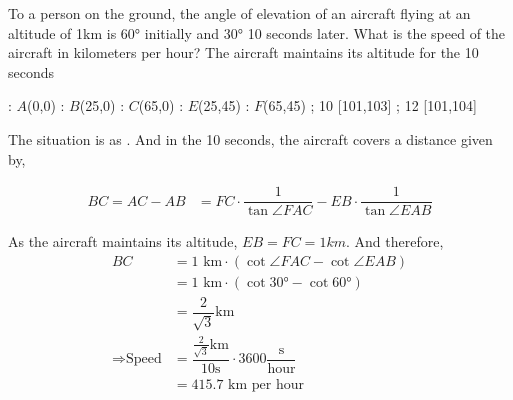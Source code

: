 

\question[3] To a person on the ground, the angle of elevation of an aircraft flying at an altitude of 1km 
is $\ang{60}$ initially and $\ang{30}$ 10 seconds later. What is the speed of the
aircraft in kilometers per hour? The aircraft maintains its altitude for the 10 seconds


\ifprintanswers
  \begin{marginfigure}
      : $A$(0,0)
      : $B$(25,0)
      : $C$(65,0)
      : $E$(25,45)
      : $F$(65,45)
    \figdrawbegin{}
      \figdrawline [100,101,102,104,103,100]
      \figdrawline [100,103]
      \figdrawline [100,104]
      \figdrawline [103,101]
       ; 10 [101,103] 
       ; 12 [101,104] 
    \figdrawend
    \centerline{\box\figBoxA}
  \end{marginfigure}
\fi 

\begin{solution}[\halfpage]
	The situation is as \asif. And in the 10 seconds, the aircraft covers 
	a distance given by, 
	
	\begin{align}
		BC = AC - AB &= FC\cdot\dfrac{1}{\tan\angle{FAC}} - EB\cdot\dfrac{1}{\tan\angle{EAB}}
	\end{align}
	
	As the aircraft maintains its altitude, $EB = FC = 1km$. And therefore, 
	\begin{align}
		BC &= \text{1 km}\cdot\left(\cot\angle{FAC} - \cot\angle{EAB}\right) \\
		   &= \text{1 km}\cdot\left(\cot\ang{30} - \cot\ang{60}\right) \\
		   &= \dfrac{2}{\sqrt{3}}\text{km} \\
		\Rightarrow \text{Speed} &= \dfrac{\frac{2}{\sqrt{3}}\text{km}}{10\text{s}}\cdot 3600\dfrac{\text{s}}{\text{hour}} \\
		   &= 415.7\text{ km per hour}
	\end{align}
\end{solution}
